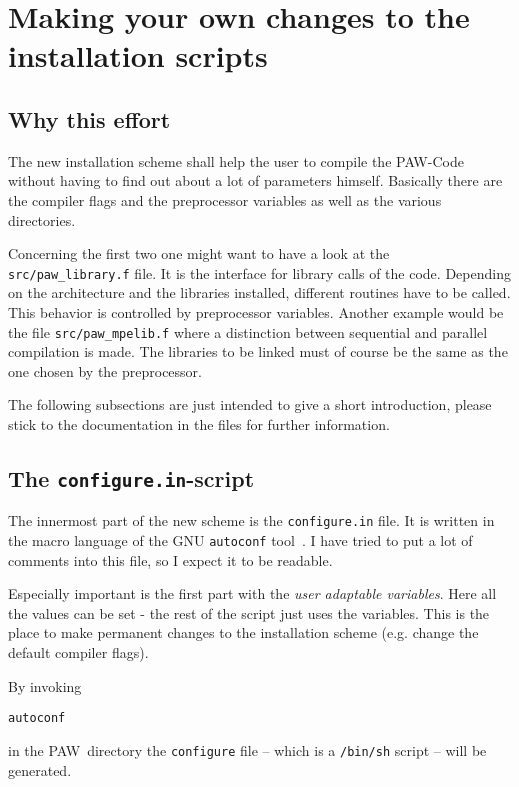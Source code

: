 \documentclass[a4paper,10pt]{article}
\newcommand{\PAW}{\textsc{PAW}}
\begin{document}
\section{Making your own changes to the installation scripts}
\label{sec:hack}

\subsection{Why this effort}

The new installation scheme shall help the user to compile the \PAW-Code
without having to find out about a lot of parameters himself.  Basically there
are the compiler flags and the preprocessor variables as well as the various
directories.  

Concerning the first two one might want to have a look at the
\texttt{src/paw\_library.f} file.  It is the interface for library calls of the
code.  Depending on the architecture and the libraries installed, different
routines have to be called.  This behavior is controlled by preprocessor
variables.  Another example would be the file \texttt{src/paw\_mpelib.f} where
a distinction between sequential and parallel compilation is made.  The
libraries to be linked must of course be the same as the one chosen by the
preprocessor.

The following subsections are just intended to give a short introduction,
please stick to the documentation in the files for further information.

\subsection{The \texttt{configure.in}-script}

The innermost part of the new scheme is the \texttt{configure.in} file.  It is
written in the macro language of the GNU \texttt{autoconf}
tool~\cite{autoconf,autoconf2}.  I have tried to put a lot of comments into
this file, so I expect it to be readable.

Especially important is the first part with the \emph{user adaptable
variables}. Here all the values can be set - the rest of the script just uses
the variables.  This is the place to make permanent changes to the installation
scheme (e.g. change the default compiler flags).

By invoking
\begin{verbatim}
autoconf
\end{verbatim}
in the \PAW\ directory the \texttt{configure} file -- which is a
\texttt{/bin/sh} script -- will be generated.
\end{document}
